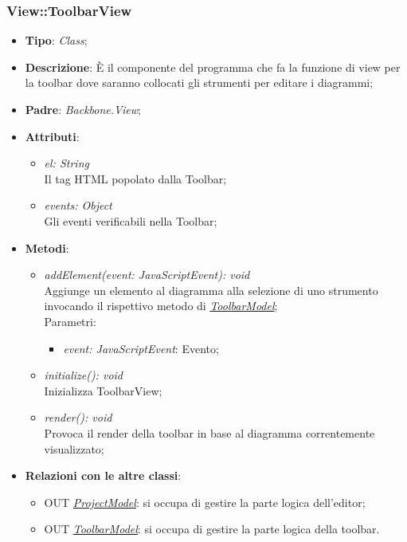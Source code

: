 \documentclass[../DefinizioneDiProdotto.tex]{subfiles}
\begin{document}
				\subsubsection{View::ToolbarView}
					\hypertarget{SWEDesigner::Client::View::ToolbarView}{}
					\begin{itemize}
						\item \textbf{Tipo}: \emph{Class};
						\item \textbf{Descrizione}: È il componente del programma che fa la funzione di view per la toolbar dove saranno collocati gli strumenti per editare i diagrammi;
						\item \textbf{Padre}: \emph{Backbone.View};
						\item \textbf{Attributi}:
						\begin{itemize}
							\item \emph{el: String} \\
							Il tag HTML popolato dalla Toolbar;
							\item \emph{events: Object} \\
							Gli eventi verificabili nella Toolbar;
						\end{itemize}
						\item \textbf{Metodi}:
						\begin{itemize}
							\item \emph{addElement(event: JavaScriptEvent): void} \\
							Aggiunge un elemento al diagramma alla selezione di uno strumento invocando il rispettivo metodo di \hyperlink{SWEDesigner::Model::ToolbarModel}{\emph{ToolbarModel}}; \\
							Parametri:
							\begin{itemize}
								\item \emph{event: JavaScriptEvent}: Evento;
							\end{itemize}
							\item \emph{initialize(): void} \\
							Inizializza ToolbarView; 
							\item \emph{render(): void} \\
							Provoca il render della toolbar in base al diagramma correntemente visualizzato; 
						\end{itemize}
						\item \textbf{Relazioni con le altre classi}:
						\begin{itemize}
							\item OUT \hyperlink{SWEDesigner::Model::ProjectModel}{\emph{ProjectModel}}: si occupa di gestire la parte logica dell'editor;
							\item OUT \hyperlink{SWEDesigner::Model::ToolbarModel}{\emph{ToolbarModel}}: si occupa di gestire la parte logica della toolbar.
						\end{itemize}
					\end{itemize}
\end{document}
